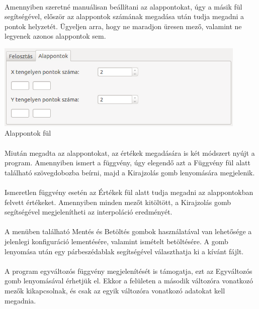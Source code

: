 \documentclass[12pt]{report}
\begin{document}
\paragraph{}
Amennyiben szeretné manuálisan beállítani az alappontokat, úgy a másik fül segítségével, először az alappontok számának megadása után tudja megadni a pontok helyzetét. Ügyeljen arra, hogy ne maradjon üresen mező, valamint ne legyenek azonos alappontok sem.
\begin{center}
\includegraphics[width=12cm]{pics/gui/partition2}  \\
{\footnotesize Alappontok fül} 
\end{center}
\paragraph{}
Miután megadta az alappontokat, az értékek megadására is két módszert nyújt a program. Amennyiben ismert a függvény, úgy elegendő azt a Függvény fül alatt található szövegdobozba beírni, majd a Kirajzolás gomb lenyomására megjelenik.
\paragraph{}
Ismeretlen függvény esetén az Értékek fül alatt tudja megadni az alappontokban felvett értékeket. Amennyiben minden mezőt kitöltött, a Kirajzolás gomb segítségével megjelenítheti az interpoláció eredményét.
\paragraph{}
A menüben található Mentés és Betöltés gombok használatával van lehetősége a jelenlegi konfiguráció lementésére, valamint ismételt betöltésére. A gomb lenyomása után egy párbeszédablak segítségével választhatja ki a kívánt fájlt.
\paragraph{}
A program egyváltozós függvény megjelenítését is támogatja, ezt az Egyváltozós gomb lenyomásával érhetjük el. Ekkor a felületen a második változóra vonatkozó mezők kikapcsolnak, és csak az egyik változóra vonatkozó adatokat kell megadnia.
\end{document}
